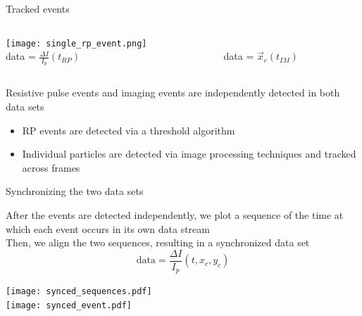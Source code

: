 \begin{frame}[c]{Tracked events}

	\begin{columns}[t]
		\begin{column}[T]{2.25in}
			{\centering 
				\texttt{[image: single\_rp\_event.png]} \\
				data = $\frac{\Delta I}{I_{p}}\left(t_{RP}\right)$ \\
				\par
			}
		\end{column}
		
		
		\begin{column}[T]{2.25in}
			{\centering 
				 \\
				\vspace{.225in}
				data = $\vec{x}_{c}\left(t_{IM}\right)$
				\par
			}
		\end{column}
	\end{columns}
	\vspace{.2in}
	
	Resistive pulse events and imaging events are independently detected in both data sets
	\begin{itemize}
		\item RP events are detected via a threshold algorithm
		\item Individual particles are detected via image processing techniques and tracked across frames
	\end{itemize}
	

\end{frame}





\begin{frame}[c]{Synchronizing the two data sets}

	{\scriptsize
		After the events are detected independently, we plot a sequence of the time at which each event occurs in its own data stream \\
		Then, we align the two sequences, resulting in a synchronized data set \\
		\[ \mathrm{data} = \frac{\Delta I}{I_{p}}\left(t, x_{c}, y_{c}\right) \]
	}
	
	{\centering
		\texttt{[image: synced\_sequences.pdf]} \\
		\vspace{.2in}
		\texttt{[image: synced\_event.pdf]} \\
		\par
	}
	
	

\end{frame}


